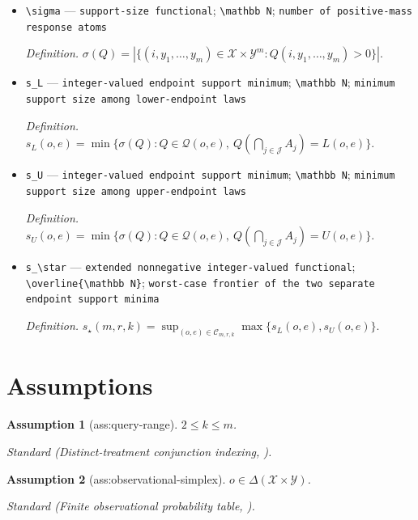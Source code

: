 \documentclass{article}
\newtheorem{assumption}{Assumption}
\begin{document}
\begin{itemize}
  \item \texttt{\textbackslash{}\allowbreak{}sigma} --- \texttt{support-\allowbreak{}size functional}; \texttt{\textbackslash{}\allowbreak{}mathbb N}; \texttt{number of positive-\allowbreak{}mass response atoms}
  \par\smallskip\noindent\emph{Definition.} \(\sigma(Q)=|\{(i,y_1,\ldots,y_m)\in\mathcal X\times\mathcal Y^m:Q(i,y_1,\ldots,y_m)>0\}|\).
  \item \texttt{s\_\allowbreak{}L} --- \texttt{integer-\allowbreak{}valued endpoint support minimum}; \texttt{\textbackslash{}\allowbreak{}mathbb N}; \texttt{minimum support size among lower-\allowbreak{}endpoint laws}
  \par\smallskip\noindent\emph{Definition.} \(s_L(o,e)=\min\{\sigma(Q):Q\in\mathcal Q(o,e),\ Q(\bigcap_{j\in\mathcal J}A_j)=L(o,e)\}\).
  \item \texttt{s\_\allowbreak{}U} --- \texttt{integer-\allowbreak{}valued endpoint support minimum}; \texttt{\textbackslash{}\allowbreak{}mathbb N}; \texttt{minimum support size among upper-\allowbreak{}endpoint laws}
  \par\smallskip\noindent\emph{Definition.} \(s_U(o,e)=\min\{\sigma(Q):Q\in\mathcal Q(o,e),\ Q(\bigcap_{j\in\mathcal J}A_j)=U(o,e)\}\).
  \item \texttt{s\_\allowbreak{}\textbackslash{}\allowbreak{}star} --- \texttt{extended nonnegative integer-\allowbreak{}valued functional}; \texttt{\textbackslash{}\allowbreak{}overline\{\textbackslash{}\allowbreak{}mathbb N\}\allowbreak{}}; \texttt{worst-\allowbreak{}case frontier of the two separate endpoint support minima}
  \par\smallskip\noindent\emph{Definition.} \(s_\star(m,r,k)=\sup_{(o,e)\in\mathcal C_{m,r,k}}\max\{s_L(o,e),s_U(o,e)\}\).
\end{itemize}

\section{Assumptions}

\begin{assumption}[ass:query-range]\label{ass:query-range}
\(2\leq k\leq m\).
\par\smallskip\noindent\emph{Standard} (Distinct-treatment conjunction indexing, \cite{ShuWangLi2026ClosedForm}).
\end{assumption}

\begin{assumption}[ass:observational-simplex]\label{ass:observational-simplex}
\(o\in\Delta(\mathcal X\times\mathcal Y)\).
\par\smallskip\noindent\emph{Standard} (Finite observational probability table, \cite{ShuWangLi2026ClosedForm}).
\end{assumption}
\end{document}
